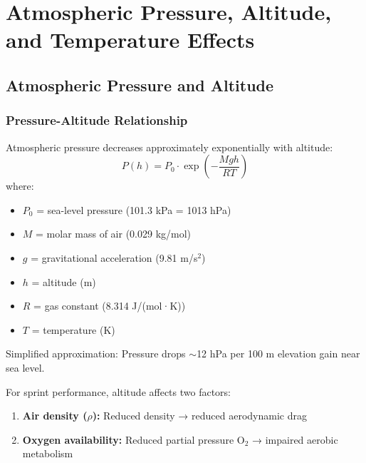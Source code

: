 \section{Atmospheric Pressure, Altitude, and Temperature Effects}

\subsection{Atmospheric Pressure and Altitude}

\subsubsection{Pressure-Altitude Relationship}

Atmospheric pressure decreases approximately exponentially with altitude:
\begin{equation}
P(h) = P_0 \cdot \exp\left(-\frac{Mgh}{RT}\right)
\end{equation}
where:
\begin{itemize}
    \item $P_0$ = sea-level pressure (101.3 kPa = 1013 hPa)
    \item $M$ = molar mass of air (0.029 kg/mol)
    \item $g$ = gravitational acceleration (9.81 m/s$^2$)
    \item $h$ = altitude (m)
    \item $R$ = gas constant (8.314 J/(mol·K))
    \item $T$ = temperature (K)
\end{itemize}

Simplified approximation: Pressure drops $\sim$12 hPa per 100 m elevation gain near sea level.

For sprint performance, altitude affects two factors:
\begin{enumerate}
    \item \textbf{Air density ($\rho$):} Reduced density → reduced aerodynamic drag
    \item \textbf{Oxygen availability:} Reduced partial pressure O$_2$ → impaired aerobic metabolism
\end{enumerate}

